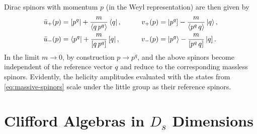 Dirac spinors with momentum $p$ (in the Weyl representation) are then given by
\begin{equation} \label{eq:massive-spinors}
  \begin{aligned}
    \bar{u}_{+}(p) &= \sbra{p^q} + \frac{m}{\spaa(q,p^q)} \bra{q},  &\qquad  v_{+}(p) &= \sket{p^q} - \frac{m}{\spaa(p^q,q)} \ket{q}, \\
    \bar{u}_{-}(p) &= \bra{p^q} + \frac{m}{\spbb(q,p^q)} \sbra{q},   & v_{-}(p) &= \ket{p^q} - \frac{m}{\spbb(p^q,q)} \sket{q}.
  \end{aligned}
\end{equation}
In the limit $m\to 0$, by construction $p \to p^q$, and the above spinors become independent of the reference vector $q$ and reduce to the corresponding massless spinors.
Evidently, the helicity amplitudes evaluated with the states from \cref{eq:massive-spinors} scale under the little group as their reference spinors.



\chapter{Clifford Algebras in $D_s$ Dimensions}
\label{sec:clifford_algebra_ds}

